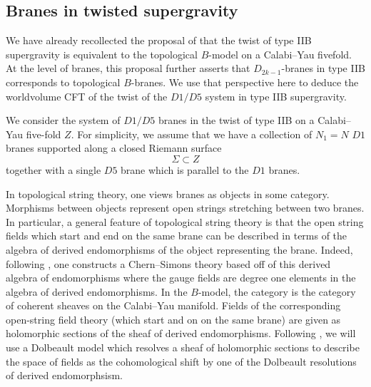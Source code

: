 \documentclass[../main.tex]{subfiles}
\begin{document}
\subsection{Branes in twisted supergravity}

We have already recollected the proposal of \cite{CLsugra} that the twist of type IIB supergravity is equivalent to the topological $B$-model on a Calabi--Yau fivefold.
At the level of branes, this proposal further asserts that $D_{2k-1}$-branes in type IIB corresponds to topological $B$-branes.
We use that perspective here to deduce the worldvolume CFT of the twist of the $D1/D5$ system in type IIB supergravity.

We consider the system of $D1/D5$ branes in the twist of type IIB on a Calabi--Yau five-fold $Z$. 
For simplicity, we assume that we have a collection of $N_1 = N$ $D1$ branes supported along a closed Riemann surface
\[
\Sigma \subset Z \]
together with a single $D5$ brane which is parallel to the $D1$ branes. 

In topological string theory, one views branes as objects in some category.
Morphisms between objects represent open strings stretching between two branes.
In particular, a general feature of topological string theory is that the open string fields which start and end on the same brane can be described in terms of the algebra of derived endomorphisms of the object representing the brane.
Indeed, following \cite{WittenOpen}, one constructs a Chern--Simons theory based off of this derived algebra of endomorphisms where the gauge fields are degree one elements in the algebra of derived endomorphisms.
In the $B$-model, the category is the category of coherent sheaves on the Calabi--Yau manifold.
Fields of the corresponding open-string field theory (which start and on on the same brane) are given as holomorphic sections of the sheaf of derived endomorphisms.
Following \cite{CLsugra}, we will use a Dolbeault model which resolves a sheaf of holomorphic sections to describe the space of fields as the cohomological shift by one of the Dolbeault resolutions of derived endomorphsism.
\end{document}
